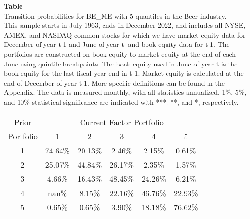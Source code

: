 \begin{table*}[ht!]
\raggedright
{}
\label{tab: transition_probs_BE_ME_Beer_with_5_quantiles}
\textbf{Table \thetable} \\
Transition probabilities for BE_ME with 5 quantiles in the Beer industry. \\
\hspace*{1em}This sample starts in July 1963, ends in December 2022, and includes all NYSE, AMEX, and NASDAQ common stocks for which we have market equity data for December of year t-1 and June of year t, and book equity data for t-1. The portfolios are constructed on book equity to market equity at the end of each June using quintile breakpoints.  The book equity used in June of year t is the book equity for the last fiscal year end in t-1.  Market equity is calculated at the end of December of year t-1.  More specific definitions can be found in the Appendix.  The data is measured monthly, with all statistics annualized.  1\%, 5\%, and 10\% statistical significance are indicated with ***, **, and *, respectively. \\
\vspace{0.5em}
\centering
\begin{adjustbox}{max width=\textwidth}
\begin{tabular}{@{}cccccc@{}}
\toprule
Prior & \multicolumn{5}{c}{Current Factor Portfolio} \\
Portfolio & 1 & 2 & 3 & 4 & 5 \\
\midrule
1 & 74.64\% & 20.13\% & 2.46\% & 2.15\% & 0.61\% \\
2 & 25.07\% & 44.84\% & 26.17\% & 2.35\% & 1.57\% \\
3 & 4.66\% & 16.43\% & 48.45\% & 24.26\% & 6.21\% \\
4 & nan\% & 8.15\% & 22.16\% & 46.76\% & 22.93\% \\
5 & 0.65\% & 0.65\% & 3.90\% & 18.18\% & 76.62\% \\
\bottomrule
\end{tabular}
\end{adjustbox}
\end{table*}